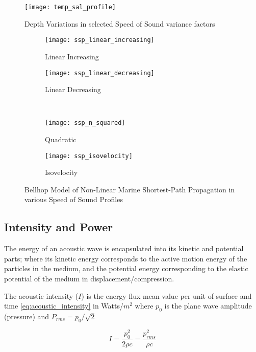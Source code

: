 \begin{figure}
	\centering
	\texttt{[image: temp\_sal\_profile]}
	\caption{Depth Variations in selected Speed of Sound variance factors}
	\label{fig:temp_sal_profile}
\end{figure}


\begin{figure}
	\begin{subfigure}[t]{0.45\textwidth}
		\centering
		\texttt{[image: ssp\_linear\_increasing]}
		\caption{Linear Increasing}
		\label{fig:ssp_linear_increasing}
	\end{subfigure}
	\begin{subfigure}[t]{0.45\textwidth}
		\centering
		\texttt{[image: ssp\_linear\_decreasing]}
		\caption{Linear Decreasing}
		\label{fig:ssp_linear_decreasing}
	\end{subfigure}\\
	\begin{subfigure}[t]{0.45\textwidth}
		\centering
		\texttt{[image: ssp\_n\_squared]}
		\caption{Quadratic}
		\label{fig:ssp_n_squared}
	\end{subfigure}
	\begin{subfigure}[t]{0.45\textwidth}
		\centering
		\texttt{[image: ssp\_isovelocity]}
		\caption{Isovelocity}
		\label{fig:ssp_isovelocity}
	\end{subfigure}
	\caption{Bellhop Model of Non-Linear Marine Shortest-Path Propagation in various Speed of Sound Profiles}
	\label{fig:ssps}
\end{figure}

\subsection{Intensity and Power} 

The energy of an acoustic wave is encapsulated into its kinetic and potential parts; where its kinetic energy corresponds to the active motion energy of the particles in the medium, and the potential energy corresponding to the elastic potential of the medium in displacement/compression.

The acoustic intensity ($I$) is the energy flux mean value per unit of surface and time \eqref{eq:acoustic_intensity} in Watts/$m^2$ where $p_0$ is the plane wave amplitude (pressure) and $P_{rms} = p_0/\sqrt{2}$

\begin{equation}
  I = \frac{p_0^2}{2\rho c} = \frac{p_{rms}^2}{\rho c}
  \label{eq:acoustic_intensity}
\end{equation}


